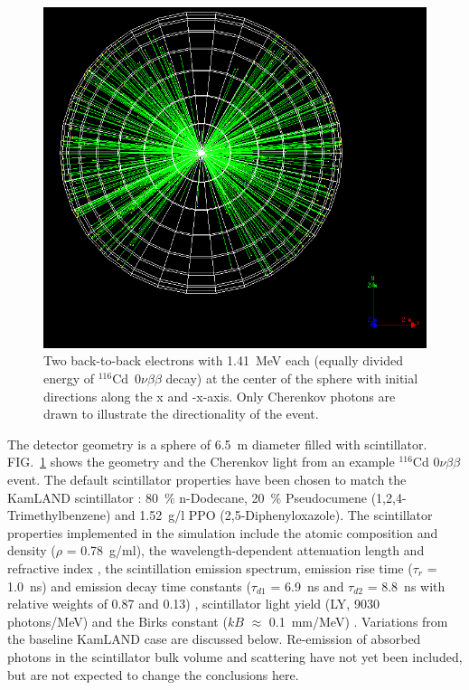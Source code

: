\documentclass[aps,prc,twocolumn,groupedaddress,showpacs,amsmath,amssymb,floatfix,superscriptaddress]{revtex4}
\begin{document}
\begin{figure}
        \begin{center}
        \includegraphics[scale=0.25]{graphs/detector_view.png}
        \caption[]{Two back-to-back electrons with 1.41~MeV each
        (equally divided energy of $^{116}$Cd~$0\nu\beta\beta$ decay) at
        the center of the sphere with initial directions along the x
        and -x-axis. Only Cherenkov photons are drawn to illustrate the
        directionality of the event. \label{detector_view}}
        \end{center}
\end{figure}

The detector geometry is a sphere of 6.5~m diameter filled with scintillator. FIG.~\ref{detector_view} shows the geometry and the Cherenkov light from an example $^{116}$Cd $0\nu\beta\beta$ event. The default
scintillator properties have been chosen to match the KamLAND
scintillator \cite{kamland2003}: 80~\% n-Dodecane, 20~\% Pseudocumene
(1,2,4-Trimethylbenzene) and 1.52~g/l PPO (2,5-Diphenyloxazole). The
scintillator properties implemented in the simulation include the
atomic composition and density ($\rho$ = 0.78~g/ml), the
wavelength-dependent attenuation length \cite{tajimaMaster} and
refractive index \cite{OlegThesis}, the scintillation emission
spectrum\cite{tajimaMaster}, emission rise time ($\tau_r$ = 1.0~ns) and emission decay
time constants ($\tau_{d1}$ = 6.9~ns and $\tau_{d2}$ = 8.8~ns with
relative weights of 0.87 and 0.13)
\cite{tajimaThesis}, scintillator light yield (LY, 9030 photons/MeV)
and the Birks constant ($kB$ $\approx$ 0.1~mm/MeV)
\cite{ChrisThesis}. Variations from the baseline KamLAND case are
discussed below. Re-emission of absorbed photons in the scintillator
bulk volume and scattering have not yet been included, but are not
expected to change the conclusions here.
\end{document}
